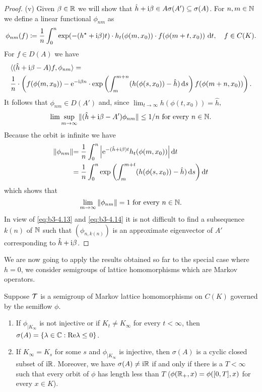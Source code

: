 \begin{proof}
    (v) Given $\beta \in \mathbb{R}$ we will show that $\hat{h} + \mathrm{i}\beta \in A\sigma(A') \subseteq \sigma(A)$.
    For $n,m \in \mathbb{N}$ we define a linear functional $\phi_{nm}$ as 
\[  
		\phi_{nm}(f) \coloneq \frac{1}{n}\int_{0}^{n} \exp(-(h^{\star}+\mathrm{i}\beta )t)\cdot h_{t}(\phi(m,x_{0}))\cdot f(\phi(m+t,x_{0})) \text{ d}t, \quad f\in C(K).
\]
For $f \in D(A)$ we have 
	\begin{align*}
	&\langle(\hat{h}+\im\beta -A)f,\phi_{nm}\rangle = \\
	&  \frac{1}{n}\cdot\left(f(\phi(m,x_{0})) - \mathrm{e}^{-\im\beta  n}\cdot %
	\exp\left(\int_{m}^{m+n} (h(\phi(s,x_{0}))-\hat{h})\ds \right)f(\phi(m+n,x_{0}))\right).
	\end{align*}
It follows that $\phi_{nm} \in D(A')$ and, since $\lim_{t\to\infty} h(\phi(t,x_{0})) = \hat{h}$,
\begin{equation}\label{eq:b3-4.13}
	\lim \sup_{m\to\infty} \|(\hat{h}+\mathrm{i}\beta -A')\phi_{nm}\| \leq 1/n \text{ for every } n \in \mathbb{N}.
\end{equation}
Because the orbit is infinite we have
	\begin{align*}
	\|\phi_{nm}\| & {= \frac{1}{n}\int_{0}^{n} \left|\mathrm{e}^{-(\hat{h}+\mathrm{i}\beta )t} h_{t}(\phi(m,x_{0}))\right| \mathop{}\!\mathrm{d}{t}} \\
	& {= \frac{1}{n}\int_{0}^{n} \exp\left(\int_{m}^{m+t} (h(\phi(s,x_{0}))-\hat{h})\mathop{}\!\mathrm{d}{s} \right)\mathop{}\!\mathrm{d}{t}}
	\end{align*}
which shows that
\begin{equation}\label{eq:b3-4.14}
	\lim_{m\to\infty} \|\phi_{nm}\| = 1 \text{ for every } n \in \mathbb{N}.
\end{equation}
In view of \eqref{eq:b3-4.13} and \eqref{eq:b3-4.14} it is not difficult to find a subsequence $k(n)$ of $\mathbb{N}$ such that $(\phi_{n,k(n)})$ is an approximate eigenvector of $A'$ corresponding to $\hat{h} + \mathrm{i}\beta$.
\end{proof}
We are now going to apply the results obtained so far to the special case where $h = 0$, \ie we consider semigroups of lattice homomorphisms which are Markov operators.
\begin{theorem}\label{thm:b3-4.9}
	Suppose $\mathcal{T}$ is a semigroup of Markov lattice homomorphisms on $C(K)$ governed by the semiflow $\phi$.
	\begin{enumerate}[\upshape (i)]
		\item 
		If $\phi_{|K_{\infty}}$ is not injective or if $K_{t} \neq K_{\infty}$ for every $t < \infty$, then $\sigma(A) = \{\lambda \in \mathbb{C} : \mathop{}\!\mathrm{Re}\lambda \leq 0\}$.
		
		\item 
		If $K_{\infty} = K_{s}$ for some $s$ and $\phi_{|K_{\infty}}$ is injective, then $\sigma(A)$ is a cyclic closed subset of $\mathrm{i} \mathbb{R}$.
		Moreover, we have $\sigma(A) \neq \mathrm{i}\mathbb{R}$ if and only if there is a $T < \infty$ such that every orbit of $\phi$ has length less than $T$ (\ie $\phi(\mathbb{R}_{+},x) = \phi([0,T],x)$ for every $x \in K$).
	\end{enumerate}
\end{theorem}
